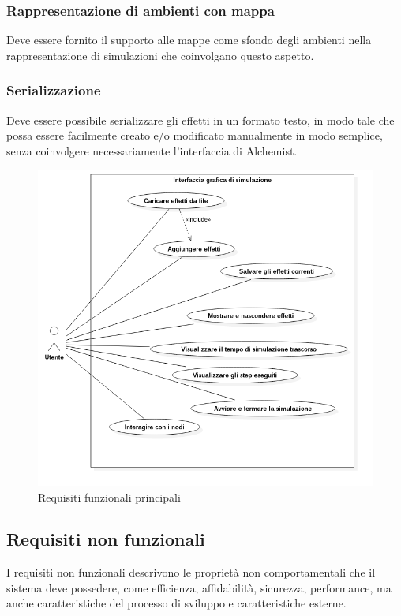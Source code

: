             \subsubsection{Rappresentazione di ambienti con mappa}\label{subsub:mappa}
                Deve essere fornito il supporto alle mappe come sfondo degli ambienti nella rappresentazione di simulazioni che coinvolgano questo aspetto.

            \subsubsection{Serializzazione }
                Deve essere possibile serializzare gli effetti in un formato testo, in modo tale che possa essere facilmente creato e/o modificato manualmente in modo semplice, senza coinvolgere necessariamente l'interfaccia di Alchemist.

                \begin{figure}[htbp]
                    \centering
                    \includegraphics[scale=0.55]{img/useCase}
                    \caption{Requisiti funzionali principali}
                    \label{fig:useCase}
                \end{figure}

        \subsection{Requisiti non funzionali}\label{sub:nonFunzionali}
            I requisiti non funzionali descrivono le proprietà non comportamentali che il sistema deve possedere, come efficienza, affidabilità, sicurezza, performance, ma anche caratteristiche del processo di sviluppo e caratteristiche esterne.

